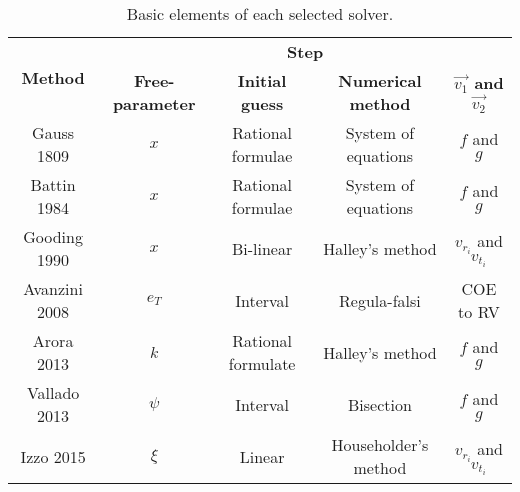 \begin{table}[H]
  \footnotesize
  \centering
  \begin{tabular}{|c|c|c|c|c|}
    \hline
    \multirow{2}{*}{\textbf{Method}} & \multicolumn{4}{c|}{\textbf{Step}}                                                                                             \\ \cline{2-5}
                                     & \textbf{Free-parameter}            & \textbf{Initial guess} & \textbf{Numerical method} & \textbf{$\vec{v_1}$ and $\vec{v_2}$} \\ \hline
    Gauss 1809                       & $x$                                & Rational formulae      & System of equations       & $f$ and $g$                          \\ \hline
    Battin 1984                      & $x$                                & Rational formulae      & System of equations       & $f$ and $g$                          \\ \hline
    Gooding 1990                     & $x$                                & Bi-linear              & Halley's method           & $v_{r_i}$ and $v_{t_i}$              \\ \hline
    Avanzini 2008                    & $e_T$                              & Interval               & Regula-falsi              & COE to RV                            \\ \hline
    Arora 2013                       & $k$                                & Rational formulate     & Halley's method           & $f$ and $g$                          \\ \hline
    Vallado 2013                     & $\psi$                             & Interval               & Bisection                 & $f$ and $g$                          \\ \hline
    Izzo 2015                        & $\xi$                              & Linear                 & Householder's method      & $v_{r_i}$ and $v_{t_i}$              \\ \hline
  \end{tabular}
  \caption[Basic elements of each selected solver.]{Basic elements of each selected solver.}
  \label{table:elements}
\end{table}
